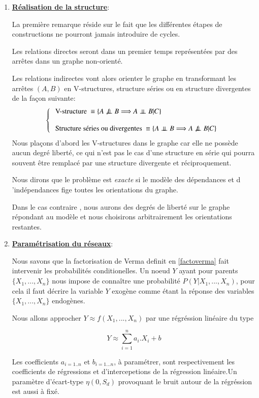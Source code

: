 \documentclass[a4paper]{article}
\begin{document}
\begin{enumerate}
\item  \underline{\textbf{ Réalisation de la structure}}:{\\}

La première remarque réside sur le fait que les différentes étapes de constructions ne pourront jamais introduire de cycles.

Les relations directes seront dans un premier temps représentées par des arrêtes dans un graphe non-orienté.

Les relations indirectes vont alors orienter le graphe en transformant les arrêtes $(A,B)$ en V-structures, structure séries ou en structure divergentes de la façon suivante:
\[
\left\lbrace 
\begin{array}{lcl} 
\text{  V-structure  }\equiv\{ A\not\ci B \Longrightarrow A\ci B|C \}  \\  \\
\text{ Structure séries ou divergentes }\equiv \{ A\ci B \Longrightarrow A\not\ci B|C \}
\end{array}\right.
\]
Nous plaçons d'abord les V-structures dans le graphe car elle ne possède aucun degré liberté, ce qui n'est pas le cas d'une structure en série qui pourra souvent être remplacé par une structure divergente et réciproquement.

Nous dirons que le problème est \textit{exacte} si le modèle des dépendances et d 'indépendances fige toutes les orientations du graphe.

 Dans le cas contraire , nous aurons des degrés de liberté sur le graphe répondant au modèle et nous choisirons arbitrairement les orientations restantes.

\item  \underline{\textbf{ Paramétrisation du réseaux}}:{\\}

Nous savons que la factorisation de Verma definit en \ref{factoverma} fait intervenir les probabilités conditionelles.
Un noeud $Y$ ayant pour parents $\{X_{1},...,X_{n}\}$ nous impose de connaître une probabilité $P(Y|X_{1},...,X_{n})$, pour cela il faut décrire la variable $Y$ exogène comme étant la réponse des variables $\{X_{1},...,X_{n}\}$ endogènes.

Nous allons approcher $Y\approx f(X_{1},...,X_{n})$  par une régréssion linéaire du type

$$Y\approx\sum_{i=1}^{n}a_{i}.X_{i}+b$$


Les coefficients $a_{i=1..n}$ et $b_{i=1...n}$, à paramétrer,  sont respectivement les coefficients de régressions et d'intercepetions de la régression linéaire.Un paramètre d'écart-type $\eta(0,S_{d})$ provoquant le bruit autour de la régréssion est aussi à fixé.


\end{enumerate}
\end{document}

